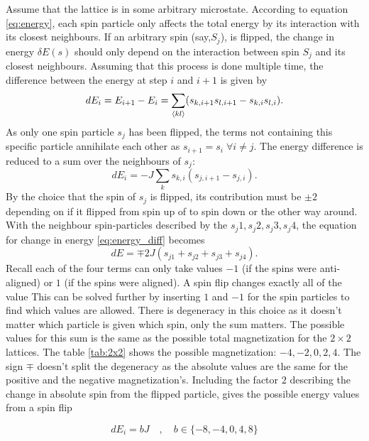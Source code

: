 \documentclass[english,notitlepage,reprint,nofootinbib]{revtex4-1}  %
\begin{document}
Assume that the lattice is in some arbitrary microstate. According to equation \eqref{eq:energy}, each spin particle only affects the total energy by its interaction with its closest neighbours. If an arbitrary spin (say,$S_j$), is flipped, the change in energy $\delta E(s)$ should only depend on the interaction between spin $S_j$ and its closest neighbours. Assuming that this process is done multiple time, the difference between the energy at step $i$ and $i+1$ is given by
\begin{equation}\label{eq:energy_diff}
    dE_i = E_{i+1} - E_i = \sum_{\braket{kl}}(s_{k,i+1}s_{l,i+1} - s_{k,i}s_{l,i}).
\end{equation}
As only one spin particle $s_j$ has been flipped, the terms not containing this specific particle annihilate each other as $s_{i+1} = s_i \;\forall i\neq j$. The energy difference is reduced to a sum over the neighbours of $s_j$:
\begin{equation}
    dE_i = -J\sum_k s_{k,i}(s_{j,i+1} - s_{j,i}). 
\end{equation}
By the choice that  the spin of $s_j$ is flipped, its contribution must be $\pm 2$ depending on if it flipped from spin up of to spin down or the other way around. With the neighbour spin-particles described by the $s_j1,s_j2,s_j3,s_j4$, the equation for change in energy \eqref{eq:energy_diff} becomes
\begin{equation}
    dE = \mp 2J(s_{j1} + s_{j2} + s_{j3} + s_{j4}).
\end{equation}
Recall each of the four terms can only take values $-1$ (if the spins were anti-aligned) or $1$ (if the spins were aligned). A spin flip changes exactly all of the value 
This can be solved further by inserting $1$ and $-1$ for the spin particles to find which values are allowed. There is degeneracy in this choice as it doesn't matter which particle is given which spin, only the sum matters. The possible values for this sum is the same as the possible total magnetization for the $2\times 2$ lattices. The table \ref{tab:2x2} shows
the possible magnetization: $-4,-2,0,2,4$. The sign $\mp$ doesn't split the degeneracy as the absolute values are the same for the positive and the negative magnetization's. Including the factor $2$ describing the change in absolute spin from the flipped particle, gives the possible energy values from a spin flip

\begin{equation}\label{eq:dE}
    dE_i = bJ \quad,\quad b\in \{-8,-4,0,4,8\}
\end{equation}
\end{document}
